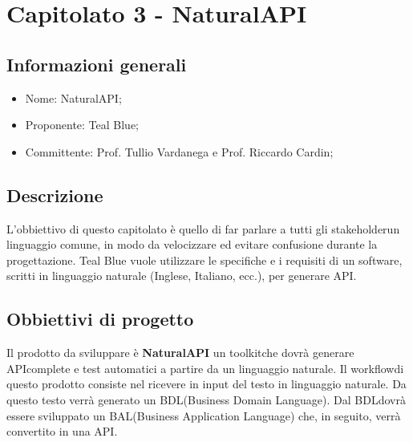 \section{Capitolato 3 - NaturalAPI}
\subsection{Informazioni generali}
\begin{itemize}
	\item Nome: NaturalAPI;
	\item Proponente: Teal Blue;
	\item Committente: Prof. Tullio Vardanega e Prof. Riccardo Cardin;
\end{itemize}
\subsection{Descrizione}
L'obbiettivo di questo capitolato è quello di far parlare a tutti gli stakeholder\glosp un linguaggio comune, in modo da velocizzare ed evitare confusione durante la progettazione. Teal Blue vuole utilizzare le specifiche e i requisiti di un software, scritti in linguaggio naturale (Inglese, Italiano, ecc.), per generare API\glo.

\subsection{Obbiettivi di progetto}
Il prodotto da sviluppare è \textbf{NaturalAPI} un toolkit\glosp che dovrà generare API\glosp complete e test automatici a partire da un linguaggio naturale. Il workflow\glosp di questo prodotto consiste nel ricevere in input del testo in linguaggio naturale. Da questo testo verrà generato un BDL\glosp (Business Domain Language). Dal BDL\glosp dovrà essere sviluppato un BAL\glosp (Business Application Language) che, in seguito, verrà convertito in una API\glo.

